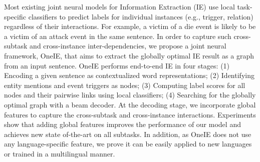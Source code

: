 Most existing joint neural models for Information Extraction (IE) use local task-specific classifiers to predict labels for individual instances (e.g., trigger, relation) regardless of their interactions. For example, a victim of a die event is likely to be a victim of an attack event in the same sentence. In order to capture such cross-subtask and cross-instance inter-dependencies, we propose a joint neural framework, OneIE, that aims to extract the globally optimal IE result as a graph from an input sentence. OneIE performs end-to-end IE in four stages: (1) Encoding a given sentence as contextualized word representations; (2) Identifying entity mentions and event triggers as nodes; (3) Computing label scores for all nodes and their pairwise links using local classifiers; (4) Searching for the globally optimal graph with a beam decoder. At the decoding stage, we incorporate global features to capture the cross-subtask and cross-instance interactions. Experiments show that adding global features improves the performance of our model and achieves new state of-the-art on all subtasks. In addition, as OneIE does not use any language-specific feature, we prove it can be easily applied to new languages or trained in a multilingual manner.
